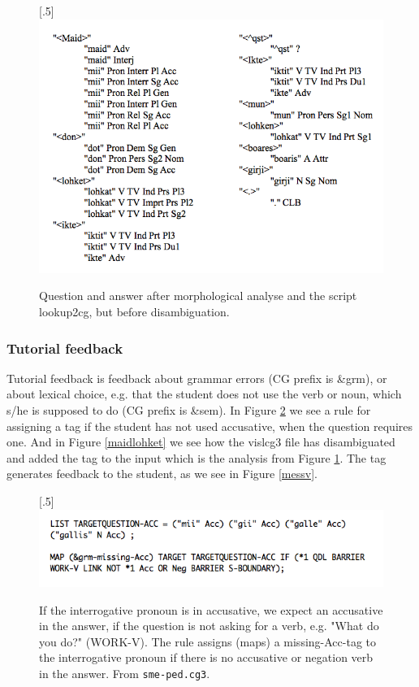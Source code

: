 \documentclass[a4paper,12pt]{article}
\begin{document}
\begin{figure}[htbp]
\begin{center}
\scalebox{.5}[.5]{\includegraphics{img/iktelohken2.png}}
\caption{Question and answer after morphological analyse and the script lookup2cg, but before disambiguation.}
\label{iktelohken}
\end{center}
\end{figure}

\subsubsection{Tutorial feedback}
Tutorial feedback is feedback about grammar errors (CG prefix is \&grm), or about lexical choice, e.g. that the student does not use the verb or noun, which s/he is supposed to do (CG prefix is \&sem). In Figure \ref{cg3} we see a rule for assigning a tag if the student has not used accusative, when the question requires one. And in Figure \ref{maidlohket} we see how the vislcg3 file has disambiguated and added the tag to the input which is the analysis from Figure \ref{iktelohken}. The tag generates feedback to the student, as we see in Figure \ref{messv}.

\begin{figure}[htbp]
\begin{center}
\scalebox{.5}[.5]{\includegraphics{img/pedcg3.png}}
\caption{If the interrogative pronoun is in accusative, we expect an accusative in the answer, if the question is not asking for a verb, e.g. "What do you do?" (WORK-V). The rule assigns (maps) a missing-Acc-tag to the interrogative pronoun if there is no accusative or negation verb in the answer. From \texttt{sme-ped.cg3}.}
\label{cg3}
\end{center}
\end{figure}
\end{document}
